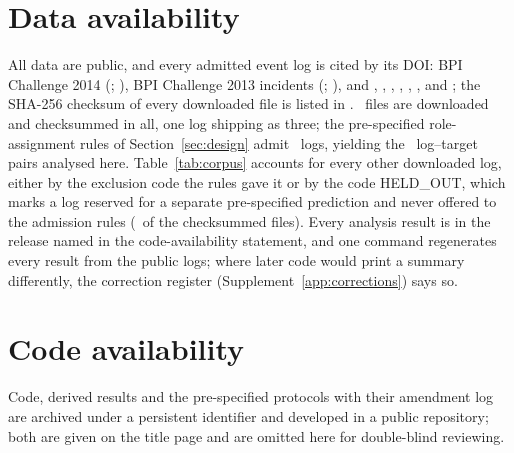 
\section*{Data availability}

All data are public, and every admitted event log is cited by its DOI: BPI
Challenge 2014 (\doiBPICfourteen; \citealp{vandongen2014bpic}), BPI Challenge
2013 incidents (\doiBPICthirteen; \citealp{steeman2013bpic}), and
\citet{steeman2013closed}, \citet{vandongen2015bpic}, \citet{vandongen2017bpic},
\citet{vandongen2019bpic}, \citet{polato2017helpdesk},
\citet{deleoni2015roadfines}, \citet{mannhardt2016sepsis} and
\citet{amaral2018incident}; the SHA-256 checksum of every downloaded file is
listed in \checksumfile. \nCorpusDownloaded\ files are downloaded and checksummed in
all, one log shipping as three; the pre-specified role-assignment rules of
Section~\ref{sec:design} admit \nLogs\ logs, yielding the \nPairs\
log--target pairs analysed here. Table~\ref{tab:corpus} accounts for every
other downloaded log, either by the exclusion code the rules gave it or by
the code \textsf{HELD\_OUT}, which marks a log reserved for a separate
pre-specified prediction and never offered to the admission rules
(\nHeldOutLogs\ of the checksummed files). Every analysis result is in the
release named in the code-availability statement, and one command
regenerates every result from the public logs; where later code would
print a summary differently, the correction register
(Supplement~\ref{app:corrections}) says so.

\ifblind
\section*{Code availability}

Code, derived results and the pre-specified protocols with their amendment
log are archived under a persistent identifier and developed in a public
repository; both are given on the title page and are omitted here for
double-blind reviewing.
\else

\fi







